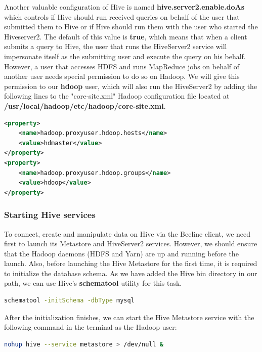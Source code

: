 \documentclass[12pt,english]{book}
\begin{document}
Another valuable configuration of Hive is named \textbf{hive.server2.enable.doAs} which controls if Hive should run received queries on behalf of the user that submitted them to Hive or if Hive should run them with the user who started the Hiveserver2.
The default of this value is \textbf{true}, which means that when a client submits a query to Hive, the user that runs the HiveServer2 service will impersonate itself as the submitting user and execute the query on his behalf.
However, a user that accesses HDFS and runs MapReduce jobs on behalf of another user needs special permission to do so on Hadoop.
We will give this permission to our \textbf{hdoop} user, which will also run the HiveServer2 by adding the following lines to the "core-site.xml" Hadoop configuration file located at \textbf{/usr/local/hadoop/etc/hadoop/core-site.xml}.

\begin{lstlisting}[language=XML, frame=single, basicstyle=\footnotesize, breaklines=true, postbreak=\mbox{\textcolor{red}{$\hookrightarrow$}\space}]
<property>
    <name>hadoop.proxyuser.hdoop.hosts</name>
    <value>hdmaster</value>
</property>
<property>
    <name>hadoop.proxyuser.hdoop.groups</name>
    <value>hdoop</value>
</property>
\end{lstlisting}

\subsubsection{Starting Hive services}

To connect, create and manipulate data on Hive via the Beeline client, we need first to launch its Metastore and HiveServer2 services.
However, we should ensure that the Hadoop daemons (HDFS and Yarn) are up and running before the launch.
Also, before launching the Hive Metastore for the first time, it is required to initialize the database schema.
As we have added the Hive bin directory in our path, we can use Hive's \textbf{schematool} utility for this task.

\begin{lstlisting}[language=bash, frame=single, basicstyle=\footnotesize]
schematool -initSchema -dbType mysql
\end{lstlisting}

After the initialization finishes, we can start the Hive Metastore service with the following command in the terminal as the Hadoop user:

\begin{lstlisting}[language=bash, frame=single, basicstyle=\footnotesize]
nohup hive --service metastore > /dev/null &
\end{lstlisting}
\end{document}
